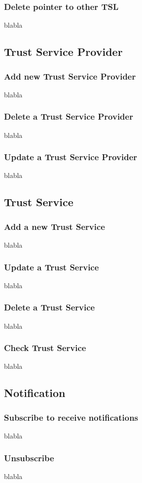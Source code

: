 \documentclass{tnreport}
\begin{document}
\subsubsection{Delete pointer to other TSL}
blabla

\subsection{Trust Service Provider}
\subsubsection{Add new Trust Service Provider}
blabla
\subsubsection{Delete a Trust Service Provider}
blabla
\subsubsection{Update a Trust Service Provider}
blabla

\subsection{Trust Service}
\subsubsection{Add a new Trust Service}
blabla
\subsubsection{Update a Trust Service}
blabla
\subsubsection{Delete a Trust Service}
blabla
\subsubsection{Check Trust Service}
blabla

\subsection{Notification}
\subsubsection{Subscribe to receive notifications}
blabla
\subsubsection{Unsubscribe}
blabla
\end{document}
